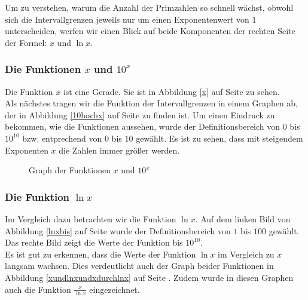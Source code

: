 \begin{refsegment}
Um zu verstehen, warum die Anzahl der Primzahlen so schnell wächst, obwohl sich
die Intervallgrenzen jeweils nur um einen Exponentenwert von 1  unterscheiden,
werfen wir einen Blick auf beide Komponenten der rechten Seite der Formel:
$x$ und $\ln{x}$.


\subsubsection*{Die Funktionen $x$ und $10^x$}
Die Funktion $x$ ist eine Gerade. Sie ist in Abbildung \ref{x} auf Seite \pageref{x} zu sehen.\\
Als nächstes tragen wir die Funktion der Intervallgrenzen in einem Graphen ab, der in
Abbildung \ref{10hochx} auf Seite \pageref{10hochx} zu finden ist. Um einen Eindruck zu
bekommen, wie die Funktionen aussehen, wurde der Definitionsbereich von $0$ bis $10^{10}$
bzw. entprechend von $0$ bis $10$ gewählt.
Es ist zu sehen, dass mit steigendem Exponenten $x$ die Zahlen immer größer werden.

\begin{figure}[!htb]
	\centering
	\hfill
	\caption{Graph der Funktionen $x$ und $10^x$}
	\label{xund10hochx}
\end{figure}


\subsubsection*{Die Funktion $\ln{x}$}
Im Vergleich dazu betrachten wir die Funktion $\ln{x}$.
Auf dem linken Bild von Abbildung \ref{lnxbis} auf Seite \pageref{lnxbis} wurde der
Definitionsbereich von $1$ bis $100$ gewählt. Das rechte Bild zeigt die Werte der
Funktion bis $10^{10}$.\\
Es ist gut zu erkennen, dass die Werte der Funktion $\ln{x}$ im Vergleich zu $x$
langsam wachsen. Dies verdeutlicht auch der Graph beider Funktionen in Abbildung
\ref{xundlnxundxdurchlnx} auf Seite \pageref{xundlnxundxdurchlnx}. Zudem wurde
in diesen Graphen auch die Funktion $\frac{x}{\ln{x}}$ eingezeichnet.


\end{refsegment}
